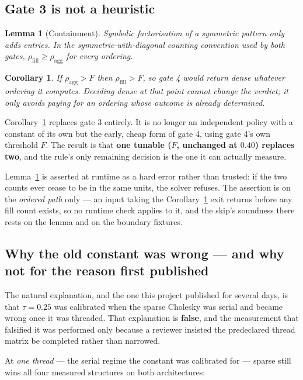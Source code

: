 \documentclass[11pt]{article}
\newtheorem{lemma}{Lemma}
\newtheorem{corollary}{Corollary}
\newcommand{\aggr}{\rho_{\mathrm{agg}}}
\newcommand{\rfill}{\rho_{\mathrm{fill}}}
\begin{document}
\subsection{Gate 3 is not a heuristic}

\begin{lemma}[Containment]
\label{lem:containment}
Symbolic factorisation of a symmetric pattern only adds entries. In the symmetric-with-diagonal
counting convention used by both gates, $\rfill \ge \aggr$ for every ordering.
\end{lemma}

\begin{corollary}
\label{cor:skip}
If $\aggr > F$ then $\rfill > F$, so gate 4 would return \emph{dense} whatever ordering it
computes. Deciding dense at that point cannot change the verdict; it only avoids paying for an
ordering whose outcome is already determined.
\end{corollary}

Corollary~\ref{cor:skip} replaces gate 3 entirely. It is no longer an independent policy with a
constant of its own but the early, cheap form of gate 4, using gate 4's own threshold $F$. The
result is that \textbf{one tunable ($F$, unchanged at $0.40$) replaces two}, and the rule's only
remaining decision is the one it can actually measure.

Lemma~\ref{lem:containment} is asserted at runtime as a hard error rather than trusted: if the two
counts ever cease to be in the same units, the solver refuses. The assertion is on the
\emph{ordered path} only --- an input taking the Corollary~\ref{cor:skip} exit returns before any
fill count exists, so no runtime check applies to it, and the skip's soundness there rests on the
lemma and on the boundary fixtures.

\subsection{Why the old constant was wrong --- and why not for the reason first published}
\label{sec:retraction}

The natural explanation, and the one this project published for several days, is that $\tau=0.25$
was calibrated when the sparse Cholesky was serial and became wrong once it was threaded. That
explanation is \textbf{false}, and the measurement that falsified it was performed only because a
reviewer insisted the predeclared thread matrix be completed rather than narrowed.

At \emph{one thread} --- the serial regime the constant was calibrated for --- sparse still wins
all four measured structures on both architectures:
\end{document}
